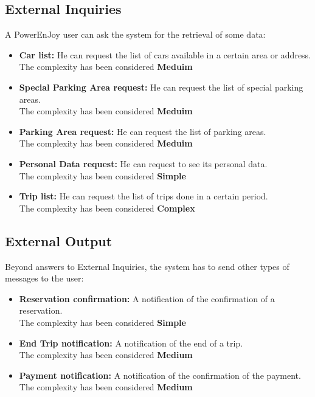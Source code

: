 \subsection{External Inquiries} 
A PowerEnJoy user can ask the system for the retrieval of some data:
\begin{itemize}
\item \textbf{Car list:} He can request the list of cars available in a certain area or address. \\The complexity has been considered \textbf{Meduim}
\item  \textbf{Special Parking Area request:} He can request the list of special parking areas. \\The complexity has been considered \textbf{Meduim}
\item  \textbf{Parking Area request:} He can request the list of parking areas. \\The complexity has been considered \textbf{Meduim}
\item  \textbf{Personal Data request:} He can request to see its personal data. \\The complexity has been considered \textbf{Simple}
\item  \textbf{Trip list:} He can request the list of trips done in a certain period.\\
The complexity has been considered \textbf{Complex}
\end{itemize}


\subsection{External Output} 
Beyond answers to External Inquiries, the system has to send other types of messages to the user:
\begin{itemize}
\item \textbf{Reservation confirmation:} A notification of the confirmation of a reservation.  \\The complexity has been considered \textbf{Simple}
\item \textbf{End Trip notification:} A notification of the end of a trip. \\The complexity has been considered \textbf{Medium}
\item \textbf{Payment notification:} A notification of the confirmation of the payment. \\The complexity has been considered \textbf{Medium}
\end{itemize}


